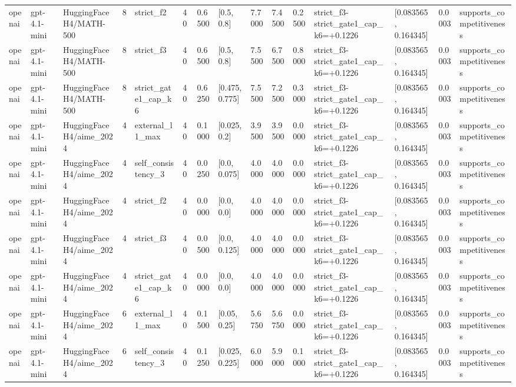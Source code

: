 \begin{tabular}{lllllllllllllll}
openai & gpt-4.1-mini & HuggingFaceH4/MATH-500 & 8 & strict\_f2 & 40 & 0.6500 & [0.5, 0.8] & 7.7000 & 7.4500 & 0.2500 & strict\_f3-strict\_gate1\_cap\_k6=+0.1226 & [0.083565, 0.164345] & 0.0003 & supports\_competitiveness \\
openai & gpt-4.1-mini & HuggingFaceH4/MATH-500 & 8 & strict\_f3 & 40 & 0.6500 & [0.5, 0.8] & 7.5500 & 6.7500 & 0.8000 & strict\_f3-strict\_gate1\_cap\_k6=+0.1226 & [0.083565, 0.164345] & 0.0003 & supports\_competitiveness \\
openai & gpt-4.1-mini & HuggingFaceH4/MATH-500 & 8 & strict\_gate1\_cap\_k6 & 40 & 0.6250 & [0.475, 0.775] & 7.5500 & 7.2500 & 0.3000 & strict\_f3-strict\_gate1\_cap\_k6=+0.1226 & [0.083565, 0.164345] & 0.0003 & supports\_competitiveness \\
openai & gpt-4.1-mini & HuggingFaceH4/aime\_2024 & 4 & external\_l1\_max & 40 & 0.1000 & [0.025, 0.2] & 3.9500 & 3.9500 & 0.0000 & strict\_f3-strict\_gate1\_cap\_k6=+0.1226 & [0.083565, 0.164345] & 0.0003 & supports\_competitiveness \\
openai & gpt-4.1-mini & HuggingFaceH4/aime\_2024 & 4 & self\_consistency\_3 & 40 & 0.0250 & [0.0, 0.075] & 4.0000 & 4.0000 & 0.0000 & strict\_f3-strict\_gate1\_cap\_k6=+0.1226 & [0.083565, 0.164345] & 0.0003 & supports\_competitiveness \\
openai & gpt-4.1-mini & HuggingFaceH4/aime\_2024 & 4 & strict\_f2 & 40 & 0.0000 & [0.0, 0.0] & 4.0000 & 4.0000 & 0.0000 & strict\_f3-strict\_gate1\_cap\_k6=+0.1226 & [0.083565, 0.164345] & 0.0003 & supports\_competitiveness \\
openai & gpt-4.1-mini & HuggingFaceH4/aime\_2024 & 4 & strict\_f3 & 40 & 0.0500 & [0.0, 0.125] & 4.0000 & 4.0000 & 0.0000 & strict\_f3-strict\_gate1\_cap\_k6=+0.1226 & [0.083565, 0.164345] & 0.0003 & supports\_competitiveness \\
openai & gpt-4.1-mini & HuggingFaceH4/aime\_2024 & 4 & strict\_gate1\_cap\_k6 & 40 & 0.0000 & [0.0, 0.0] & 4.0000 & 4.0000 & 0.0000 & strict\_f3-strict\_gate1\_cap\_k6=+0.1226 & [0.083565, 0.164345] & 0.0003 & supports\_competitiveness \\
openai & gpt-4.1-mini & HuggingFaceH4/aime\_2024 & 6 & external\_l1\_max & 40 & 0.1500 & [0.05, 0.25] & 5.6750 & 5.6750 & 0.0000 & strict\_f3-strict\_gate1\_cap\_k6=+0.1226 & [0.083565, 0.164345] & 0.0003 & supports\_competitiveness \\
openai & gpt-4.1-mini & HuggingFaceH4/aime\_2024 & 6 & self\_consistency\_3 & 40 & 0.1250 & [0.025, 0.225] & 6.0000 & 5.9000 & 0.1000 & strict\_f3-strict\_gate1\_cap\_k6=+0.1226 & [0.083565, 0.164345] & 0.0003 & supports\_competitiveness \\

\end{tabular}
